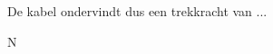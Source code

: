 \documentclass{ximera}
\begin{document}
\begin{question}
\begin{hint}
\begin{hint}
De kabel ondervindt dus een trekkracht van ...
%    
% 
% 
 \end{hint}

 
\end{hint}

 N

\end{question}
\end{document}
